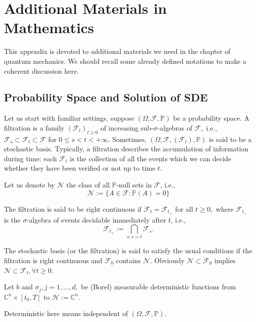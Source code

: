 \chapter{Additional Materials in Mathematics}\label{Appendix: A}
This appendix is devoted to additional materials we need in the chapter of quantum mechanics. We should recall some already defined notations to make a coherent discussion here.
\section{Probability Space and Solution of SDE}
Let us start with familiar settings, suppose $(\Omega, \mathcal{F}, \mathbb{P})$ be a probability space. A filtration is a family $\left(\mathcal{F}_{t}\right)_{t \geq 0}$ of increasing sub-$\sigma$-algebras of $\mathcal{F},$ i.e., $\mathcal{F}_{s} \subset \mathcal{F}_{t} \subset \mathcal{F}$ for $0 \leq s<t<+\infty .$ Sometimes, $\left(\Omega, \mathcal{F},\left(\mathcal{F}_{t}\right), \mathbb{P}\right)$ is said to be a stochastic basis. Typically, a filtration describes the accumulation of information during time: each $\mathcal{F}_{t}$ is the collection of all the events which we can decide whether they have been verified or not up to time $t .$

Let us denote by $\mathcal{N}$ the class of all $\mathbb{P}$-null sets in $\mathcal{F}$, i.e., \[ \mathcal{N}:=\{A \in \mathcal{F}: \mathbb{P}(A)=0\} \]
\begin{definition}
	The filtration is said to be right continuous if $\mathcal{F}_{t}=\mathcal{F}_{t_{+}}$ for all $t \geq 0,$ where $\mathcal{F}_{t_{+}}$ is the $\sigma$-algebra of events decidable immediately after $t$, i.e., \[ \mathcal{F}_{t_{+}}:=\bigcap_{s: s>t} \mathcal{F}_{s} .\]

The stochastic basis (or the filtration) is said to satisfy the usual conditions if the filtration is right continuous and $\mathcal{F}_{0}$ contains $\mathcal{N}$. Obviously $\mathcal{N} \subset \mathcal{F}_{0}$ implies $\mathcal{N} \subset \mathcal{F}_{t}, \forall t \geq 0$.
\end{definition}

\begin{hypothesis}\label{hypo:SDEclass}
	Let $b$ and $\sigma_{j}, j=1, \ldots, d,$ be (Borel) measurable deterministic functions from $\mathbb{C}^{n} \times\left[t_{0}, T\right]$ to $ \mathcal{H} := \mathbb{C}^{n}$.
\end{hypothesis}

Deterministic here means independent of $(\Omega, \mathcal{F}, \mathbb{P})$.

